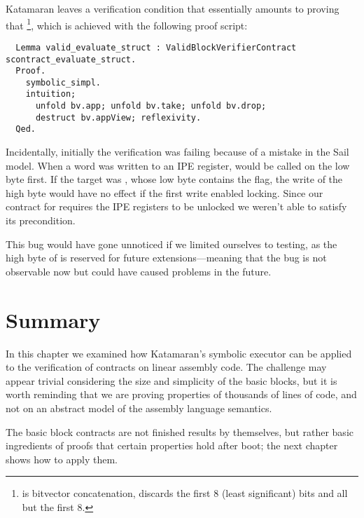 Katamaran leaves a verification condition that essentially amounts to proving that \footnote{ is bitvector concatenation,  discards the first 8 (least significant) bits and  all but the first 8.}, which is achieved with the following proof script:

\begin{verbatim}
  Lemma valid_evaluate_struct : ValidBlockVerifierContract scontract_evaluate_struct.
  Proof.
    symbolic_simpl.
    intuition;
      unfold bv.app; unfold bv.take; unfold bv.drop;
      destruct bv.appView; reflexivity.
  Qed.
\end{verbatim}

Incidentally, initially the verification was failing because of a mistake in the Sail model. When a word was written to an IPE register,  would be called on the low byte first. If the target was , whose low byte contains the  flag, the write of the high byte would have no effect if the first write enabled locking. Since our contract for  requires the IPE registers to be unlocked we weren't able to satisfy its precondition.

This bug would have gone unnoticed if we limited ourselves to testing, as the high byte of  is reserved for future extensions---meaning that the bug is not observable now but could have caused problems in the future.

\section{Summary}

In this chapter we examined how Katamaran's symbolic executor can be applied to the verification of contracts on linear assembly code. The challenge may appear trivial considering the size and simplicity of the basic blocks, but it is worth reminding that we are proving properties of thousands of lines of \usail code, and not on an abstract model of the assembly language semantics.

The basic block contracts are not finished results by themselves, but rather basic ingredients of proofs that certain properties hold after boot; the next chapter shows how to apply them.
